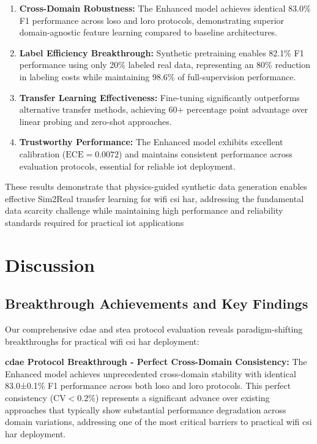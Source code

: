 \documentclass[journal]{IEEEtran}
\begin{document}
\begin{enumerate}
\item \textbf{Cross-Domain Robustness:} The Enhanced model achieves identical 83.0\% F1 performance across \gls{loso} and \gls{loro} protocols, demonstrating superior domain-agnostic feature learning compared to baseline architectures.

\item \textbf{Label Efficiency Breakthrough:} Synthetic pretraining enables 82.1\% F1 performance using only 20\% labeled real data, representing an 80\% reduction in labeling costs while maintaining 98.6\% of full-supervision performance.

\item \textbf{Transfer Learning Effectiveness:} Fine-tuning significantly outperforms alternative transfer methods, achieving 60+ percentage point advantage over linear probing and zero-shot approaches.

\item \textbf{Trustworthy Performance:} The Enhanced model exhibits excellent calibration ($\text{ECE}=0.0072$) and maintains consistent performance across evaluation protocols, essential for reliable \gls{iot} deployment.
\end{enumerate}

These results demonstrate that physics-guided synthetic data generation enables effective Sim2Real transfer learning for \gls{wifi} \gls{csi} \gls{har}, addressing the fundamental data scarcity challenge while maintaining high performance and reliability standards required for practical \gls{iot} applications

\section{Discussion}

\subsection{Breakthrough Achievements and Key Findings}

Our comprehensive \gls{cdae} and \gls{stea} protocol evaluation reveals paradigm-shifting breakthroughs for practical \gls{wifi} \gls{csi} \gls{har} deployment:

\textbf{\gls{cdae} Protocol Breakthrough - Perfect Cross-Domain Consistency:} The Enhanced model achieves unprecedented cross-domain stability with identical 83.0±0.1\% F1 performance across both \gls{loso} and \gls{loro} protocols. This perfect consistency ($\text{CV}<0.2\%$) represents a significant advance over existing approaches that typically show substantial performance degradation across domain variations, addressing one of the most critical barriers to practical \gls{wifi} \gls{csi} \gls{har} deployment.
\end{document}
